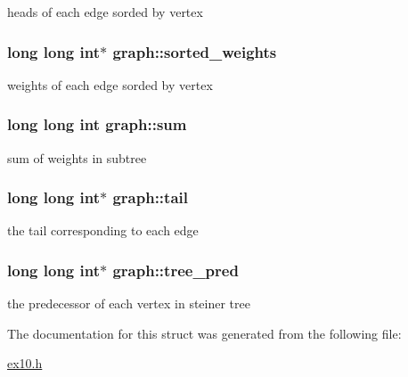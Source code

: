 heads of each edge sorded by vertex \hypertarget{structgraph_ab87c46687efb577a28a24c1ff940f77c}{
\subsubsection[{sorted\+\_\+weights}]{\setlength{\rightskip}{0pt plus 5cm}long long int$\ast$ graph\+::sorted\+\_\+weights}}\label{structgraph_ab87c46687efb577a28a24c1ff940f77c}
weights of each edge sorded by vertex \hypertarget{structgraph_a517aeb6e7e14febc089e69d578ab8a17}{
\subsubsection[{sum}]{\setlength{\rightskip}{0pt plus 5cm}long long int graph\+::sum}}\label{structgraph_a517aeb6e7e14febc089e69d578ab8a17}
sum of weights in subtree \hypertarget{structgraph_ae0d45355657d09a8515fdb97c3c46938}{
\subsubsection[{tail}]{\setlength{\rightskip}{0pt plus 5cm}long long int$\ast$ graph\+::tail}}\label{structgraph_ae0d45355657d09a8515fdb97c3c46938}
the tail corresponding to each edge \hypertarget{structgraph_ad531dc27dac0b3cc7965f070e1ba88f2}{
\subsubsection[{tree\+\_\+pred}]{\setlength{\rightskip}{0pt plus 5cm}long long int$\ast$ graph\+::tree\+\_\+pred}}\label{structgraph_ad531dc27dac0b3cc7965f070e1ba88f2}
the predecessor of each vertex in steiner tree 

The documentation for this struct was generated from the following file\+:\begin{DoxyCompactItemize}
\item 
\hyperlink{ex10_8h}{ex10.\+h}\end{DoxyCompactItemize}
